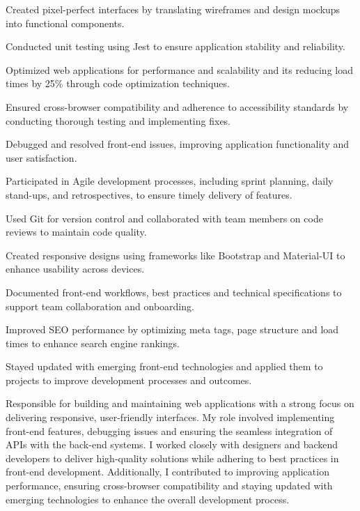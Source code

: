 \begin{cventries}
{\begin{cvitems}
        \item {Created pixel-perfect interfaces by translating wireframes and design mockups into functional components.}
        \item {Conducted unit testing using Jest to ensure application stability and reliability.}
        \item {Optimized web applications for performance and scalability and its reducing load times by 25\% through code optimization techniques.}
        \item {Ensured cross-browser compatibility and adherence to accessibility standards by conducting thorough testing and implementing fixes.}
        \item {Debugged and resolved front-end issues, improving application functionality and user satisfaction.}
        \item {Participated in Agile development processes, including sprint planning, daily stand-ups, and retrospectives, to ensure timely delivery of features.}
        \item {Used Git for version control and collaborated with team members on code reviews to maintain code quality.}
        \item {Created responsive designs using frameworks like Bootstrap and Material-UI to enhance usability across devices.}
        \item {Documented front-end workflows, best practices and technical specifications to support team collaboration and onboarding.}
        \item {Improved SEO performance by optimizing meta tags, page structure and load times to enhance search engine rankings.}
        \item {Stayed updated with emerging front-end technologies and applied them to projects to improve development processes and outcomes.}
      \end{cvitems}
    }
    {
      Responsible for building and maintaining web applications with a strong focus on delivering responsive, user-friendly interfaces. My role involved implementing front-end features, debugging issues and ensuring the seamless integration of APIs with the back-end systems. I worked closely with designers and backend developers to deliver high-quality solutions while adhering to best practices in front-end development. Additionally, I contributed to improving application performance, ensuring cross-browser compatibility and staying updated with emerging technologies to enhance the overall development process.
    }
\end{cventries}
